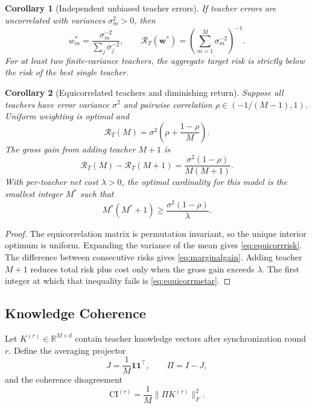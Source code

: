 \documentclass[10pt,twocolumn,a4paper]{article}
\newtheorem{corollary}{Corollary}
\newcommand{\R}{\mathbb{R}}
\newcommand{\cR}{\mathcal{R}}
\newcommand{\ind}{\mathbf{1}}
\begin{document}
\begin{corollary}[Independent unbiased teacher errors]
If teacher errors are uncorrelated with variances \(\sigma_m^2>0\), then
\begin{equation}
 w_m^*=\frac{\sigma_m^{-2}}{\sum_j\sigma_j^{-2}},
 \qquad
 \cR_T(\bm w^*)=\left(\sum_{m=1}^{M}\sigma_m^{-2}\right)^{-1}.
\label{eq:precisionweights}
\end{equation}
For at least two finite-variance teachers, the aggregate target risk is strictly below the risk of the best single teacher.
\end{corollary}

\begin{corollary}[Equicorrelated teachers and diminishing return]
\label{cor:equicorr}
Suppose all teachers have error variance \(\sigma^2\) and pairwise correlation \(\rho\in(-1/(M-1),1)\). Uniform weighting is optimal and
\begin{equation}
 \cR_T(M)=\sigma^2\left(\rho+\frac{1-\rho}{M}\right).
\label{eq:equicorrrisk}
\end{equation}
The gross gain from adding teacher \(M+1\) is
\begin{equation}
 \cR_T(M)-\cR_T(M+1)
 =\frac{\sigma^2(1-\rho)}{M(M+1)}.
\label{eq:marginalgain}
\end{equation}
With per-teacher net cost \(\lambda>0\), the optimal cardinality for this model is the smallest integer \(M^*\) such that
\begin{equation}
 M^*(M^*+1)\ge\frac{\sigma^2(1-\rho)}{\lambda}.
\label{eq:equicorrmstar}
\end{equation}
\end{corollary}

\begin{proof}
The equicorrelation matrix is permutation invariant, so the unique interior optimum is uniform. Expanding the variance of the mean gives \cref{eq:equicorrrisk}. The difference between consecutive risks gives \cref{eq:marginalgain}. Adding teacher \(M+1\) reduces total risk plus cost only when the gross gain exceeds \(\lambda\). The first integer at which that inequality fails is \cref{eq:equicorrmstar}.
\end{proof}

\subsection{Knowledge Coherence}

Let \(K^{(r)}\in\R^{M\times d}\) contain teacher knowledge vectors after synchronization round \(r\). Define the averaging projector
\begin{equation}
 J=\frac{1}{M}\ind\ind^\top,
 \qquad \Pi=I-J,
\end{equation}
and the coherence disagreement
\begin{equation}
 \mathrm{CI}^{(r)}=\frac{1}{M}\|\Pi K^{(r)}\|_F^2.
\label{eq:consensusci}
\end{equation}
\end{document}

